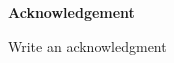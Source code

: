 \newpage
{\Huge \bf Acknowledgement}
\vspace{24pt} 


Write an acknowledgment


\newpage
\vspace*{\fill}

